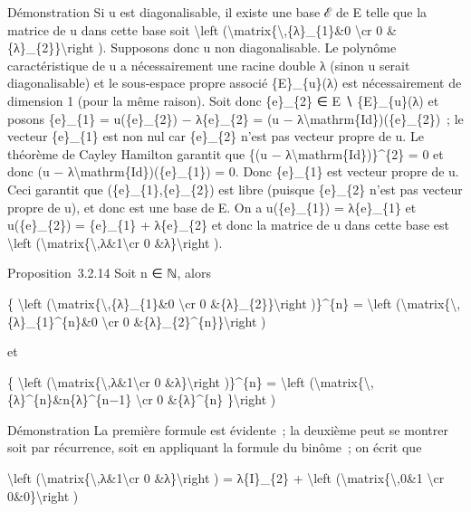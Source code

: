\documentclass[]{article}
\begin{document}
Démonstration Si u est diagonalisable, il existe une base ℰ de E telle
que la matrice de u dans cette base soit \textbackslash{}left
(\textbackslash{}matrix\{\textbackslash{},\{λ\}\_\{1\}\&0
\textbackslash{}cr 0 \&\{λ\}\_\{2\}\}\textbackslash{}right ). Supposons
donc u non diagonalisable. Le polynôme caractéristique de u a
nécessairement une racine double λ (sinon u serait diagonalisable) et le
sous-espace propre associé \{E\}\_\{u\}(λ) est nécessairement de
dimension 1 (pour la même raison). Soit donc \{e\}\_\{2\} ∈ E ∖
\{E\}\_\{u\}(λ) et posons \{e\}\_\{1\} = u(\{e\}\_\{2\}) − λ\{e\}\_\{2\}
= (u − λ\textbackslash{}mathrm\{Id\})(\{e\}\_\{2\})~; le vecteur
\{e\}\_\{1\} est non nul car \{e\}\_\{2\} n'est pas vecteur propre de u.
Le théorème de Cayley Hamilton garantit que \{(u −
λ\textbackslash{}mathrm\{Id\})\}\^{}\{2\} = 0 et donc (u −
λ\textbackslash{}mathrm\{Id\})(\{e\}\_\{1\}) = 0. Donc \{e\}\_\{1\} est
vecteur propre de u. Ceci garantit que (\{e\}\_\{1\},\{e\}\_\{2\}) est
libre (puisque \{e\}\_\{2\} n'est pas vecteur propre de u), et donc est
une base de E. On a u(\{e\}\_\{1\}) = λ\{e\}\_\{1\} et u(\{e\}\_\{2\}) =
\{e\}\_\{1\} + λ\{e\}\_\{2\} et donc la matrice de u dans cette base est
\textbackslash{}left
(\textbackslash{}matrix\{\textbackslash{},λ\&1\textbackslash{}cr 0
\&λ\}\textbackslash{}right ).

Proposition~3.2.14 Soit n ∈ ℕ, alors

\{ \textbackslash{}left
(\textbackslash{}matrix\{\textbackslash{},\{λ\}\_\{1\}\&0
\textbackslash{}cr 0 \&\{λ\}\_\{2\}\}\textbackslash{}right )\}\^{}\{n\}
= \textbackslash{}left
(\textbackslash{}matrix\{\textbackslash{},\{λ\}\_\{1\}\^{}\{n\}\&0
\textbackslash{}cr 0 \&\{λ\}\_\{2\}\^{}\{n\}\}\textbackslash{}right )

et

\{ \textbackslash{}left
(\textbackslash{}matrix\{\textbackslash{},λ\&1\textbackslash{}cr 0
\&λ\}\textbackslash{}right )\}\^{}\{n\} = \textbackslash{}left
(\textbackslash{}matrix\{\textbackslash{},\{λ\}\^{}\{n\}\&n\{λ\}\^{}\{n−1\}
\textbackslash{}cr 0 \&\{λ\}\^{}\{n\} \}\textbackslash{}right )

Démonstration La première formule est évidente~; la deuxième peut se
montrer soit par récurrence, soit en appliquant la formule du binôme~;
on écrit que

\textbackslash{}left
(\textbackslash{}matrix\{\textbackslash{},λ\&1\textbackslash{}cr 0
\&λ\}\textbackslash{}right ) = λ\{I\}\_\{2\} + \textbackslash{}left
(\textbackslash{}matrix\{\textbackslash{},0\&1 \textbackslash{}cr
0\&0\}\textbackslash{}right )
\end{document}
